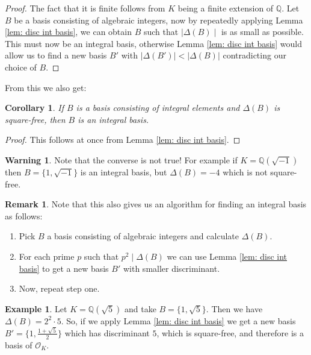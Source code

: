 \documentclass[11pt,a4paper]{report}
\theoremstyle{plain}
\newtheorem{corollary}[subsection]{Corollary}
\theoremstyle{definition}
\newtheorem{exmp}[subsection]{Example}
\theoremstyle{definition}
\newtheorem{rmrk}[subsection]{Remark}
\newtheorem{warn}[subsection]{Warning}
\def\QQ{\mathbb{Q}}
\def \OO {\mathcal{O}}
\begin{document}
	\begin{proof}
		The fact that it is finite follows from $K$ being a finite extension of $\QQ$.	
		Let $B$ be a basis consisting of algebraic integers, now by repeatedly applying Lemma \ref{lem: disc int basis}, we can obtain $B$ such that $\mid \Delta(B) \mid $ is as small as possible. This must now be an integral basis, otherwise Lemma \ref{lem: disc int basis} would allow us to find a new basis $B'$ with $|\Delta(B')| < |\Delta(B)|$ contradicting our choice of $B$. 
	\end{proof}
	
	From this we also get:
	\begin{corollary}\label{cor: square free implies int basis}
		If $B$ is a basis consisting of integral elements and $\Delta(B)$ is square-free, then $B$ is an integral basis.
	\end{corollary}
	
	\begin{proof}
		This follows at once from Lemma \ref{lem: disc int basis}.
	\end{proof}
	
	
	\begin{warn}
		Note that the converse is not true! For example if $K=\QQ(\sqrt{-1})$ then $B=\{1,\sqrt{-1}\}$ is an integral basis, but $\Delta(B)=-4$ which is not square-free.
	\end{warn}
	\begin{rmrk}
		Note that this also gives us an algorithm for finding an integral basis as follows:
		\begin{enumerate}
			\item Pick $B$ a basis consisting of algebraic integers and calculate $\Delta(B)$.
			\item For each prime $p$ such that $p^2 \mid \Delta(B)$ we can use Lemma \ref{lem: disc int basis} to get a new basis $B'$ with smaller discriminant.
			\item Now, repeat step one.
		\end{enumerate}
	\end{rmrk}
	
	\begin{exmp}
		Let $K=\QQ(\sqrt{5})$ and take $B=\{1,\sqrt{5}\}$. Then we have $\Delta(B)=2^2\cdot5$. So, if we apply Lemma \ref{lem: disc int basis} we get a new basis $B'=\{1,\frac{1+\sqrt{5}}{2}\}$ which has discriminant $5$, which is square-free, and therefore is  a basis of $\OO_K$.
	\end{exmp}
	
	
	
\end{document}
